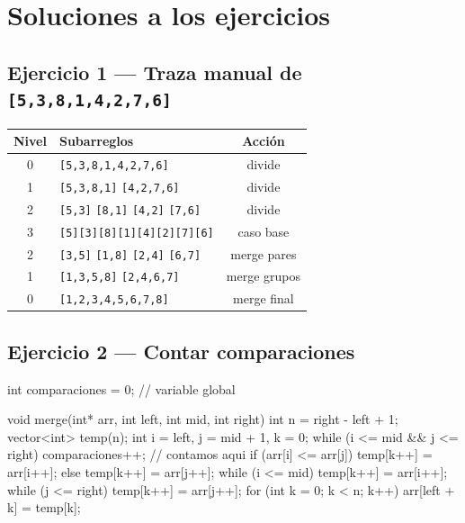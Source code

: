\documentclass[12pt, oneside]{article}
\begin{document}
\section{Soluciones a los ejercicios}

\subsection{Ejercicio 1 — Traza manual de \texttt{[5,3,8,1,4,2,7,6]}}

\begin{center}
\begin{tabular}{clc}
  \toprule
  \textbf{Nivel} & \textbf{Subarreglos} & \textbf{Acción} \\
  \midrule
  0 & \texttt{[5,3,8,1,4,2,7,6]} & divide \\
  1 & \texttt{[5,3,8,1]} \quad \texttt{[4,2,7,6]} & divide \\
  2 & \texttt{[5,3]} \texttt{[8,1]} \quad \texttt{[4,2]} \texttt{[7,6]} & divide \\
  3 & \texttt{[5][3][8][1][4][2][7][6]} & caso base \\
  2 & \texttt{[3,5]} \texttt{[1,8]} \quad \texttt{[2,4]} \texttt{[6,7]} & merge pares \\
  1 & \texttt{[1,3,5,8]} \quad \texttt{[2,4,6,7]} & merge grupos \\
  0 & \texttt{[1,2,3,4,5,6,7,8]} & merge final \\
  \bottomrule
\end{tabular}
\end{center}

\subsection{Ejercicio 2 — Contar comparaciones}

\begin{codigo}
int comparaciones = 0;   // variable global

void merge(int* arr, int left, int mid, int right) {
    int n = right - left + 1;
    vector<int> temp(n);
    int i = left, j = mid + 1, k = 0;
    while (i <= mid && j <= right) {
        comparaciones++;   // contamos aqui
        if (arr[i] <= arr[j]) temp[k++] = arr[i++];
        else                  temp[k++] = arr[j++];
    }
    while (i <= mid)   temp[k++] = arr[i++];
    while (j <= right) temp[k++] = arr[j++];
    for (int k = 0; k < n; k++) arr[left + k] = temp[k];
}
\end{codigo}
\end{document}
